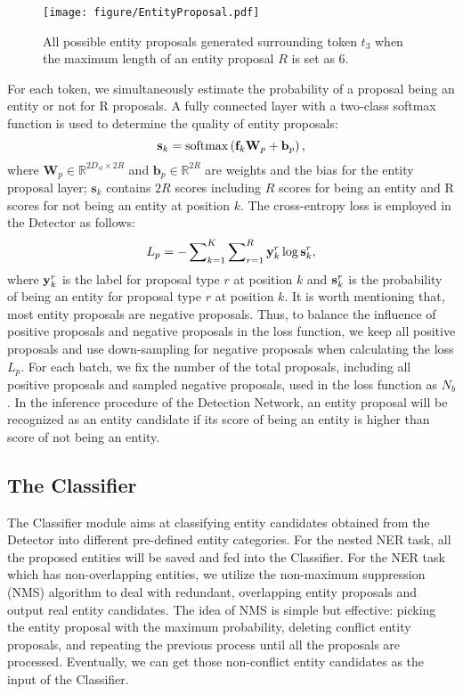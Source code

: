 \documentclass[11pt,a4paper]{article}
\begin{document}
\begin{figure}[htbp!]
    \centering
    \texttt{[image: figure/EntityProposal.pdf]}\vspace{-2mm}
    \caption{All possible entity proposals generated surrounding token $t_{3}$ when the maximum length of an entity proposal $R$ is set as 6.}
    \label{fig:entity_proposal}
\end{figure}

For each token, we simultaneously estimate the probability of a proposal being an entity or not for R proposals.
A fully connected layer with a two-class softmax function is used to determine the quality of entity proposals:
\begin{equation}
    \mathbf{s}_{k} = {\rm softmax}\left (\mathbf{f}_{k}\mathbf{W}_{p} + \mathbf{b}_{p}\right ),
\end{equation}
where \( \mathbf{W}_{p} \in \mathbb{R}^{2D_{sl} \times 2R}\) and \( \mathbf{b}_{p} \in \mathbb{R}^{2R}\) are weights and the bias for the entity proposal layer; $\mathbf{s}_{k}$ contains $2R$ scores including $R$ scores for being an entity and R scores for not being an entity at position $k$. The cross-entropy loss is employed in the Detector as follows:
\begin{equation}
   {L_p} =  - \sum\nolimits_{k = 1}^K {\sum\nolimits_{r = 1}^R {{\bf{y}}_{k}^{r}\log {\bf{s}}_k^r} },
\end{equation}
where ${\bf{y}}_{k}^{r}$ is the label for proposal type $r$ at position $k$ and ${\bf{s}}_{k}^{r}$ is the probability of being an entity for proposal type $r$ at position $k$.
It is worth mentioning that, most entity proposals are negative proposals. Thus, 
to balance the influence of positive proposals and negative proposals in the loss function, we keep all positive proposals and use down-sampling for negative proposals when calculating the loss $L_p$.  
For each batch, we fix the number of the total proposals, including all positive proposals and sampled negative proposals, used in the loss function as $N_b$.
In the inference procedure of the Detection Network, an entity proposal will be recognized as an entity candidate if its score of being an entity is higher than score of not being an entity. 

\subsection{The Classifier}
The Classifier module aims at classifying entity candidates obtained from the Detector into different pre-defined entity categories. For the nested NER task, all the proposed entities will be saved and fed into the Classifier. For the NER task which has non-overlapping entities, we utilize the non-maximum suppression (NMS) algorithm \citep{neubeck2006efficient} to deal with redundant, overlapping entity proposals and output real entity candidates.
The idea of NMS is simple but effective: picking the entity proposal with the maximum probability, deleting conflict entity proposals, and repeating the previous process until all the proposals are processed. Eventually, we can get those non-conflict entity candidates as the input of the Classifier.
\end{document}
